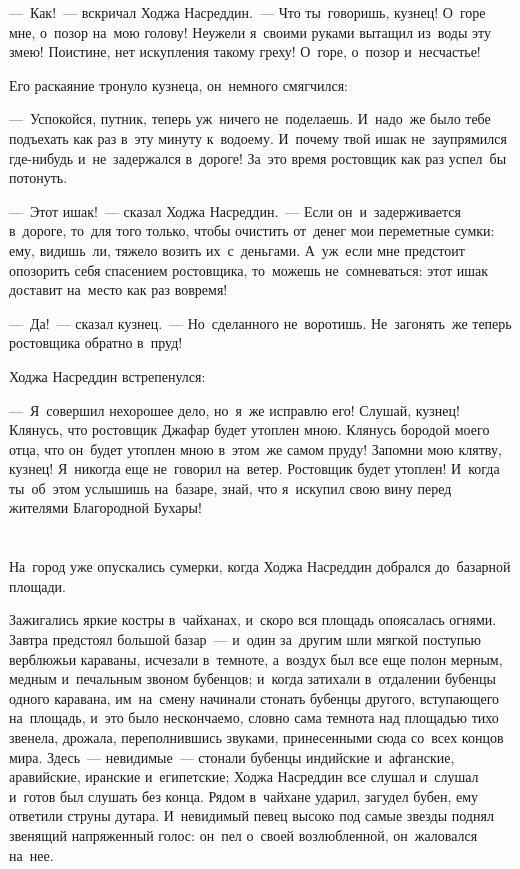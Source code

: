 \documentclass[12pt,a4paper]{book}
\begin{document}
—~Как!~— вскричал Ходжа Насреддин.~— Что ты~говоришь, кузнец! О~горе мне, о~позор на~мою голову! Неужели я~своими руками вытащил из~воды эту змею! Поистине, нет искупления такому греху! О~горе, о~позор и~несчастье!

Его раскаяние тронуло кузнеца, он~немного смягчился:

—~Успокойся, путник, теперь уж~ничего не~поделаешь. И~надо~же было тебе подъехать как раз в~эту минуту к~водоему. И~почему твой ишак не~заупрямился где-нибудь и~не~задержался в~дороге! За~это время ростовщик как раз успел~бы потонуть.

—~Этот ишак!~— сказал Ходжа Насреддин.~— Если он~и~задерживается в~дороге, то~для того только, чтобы очистить от~денег мои переметные сумки: ему, видишь~ли, тяжело возить их~с~деньгами. А~уж~если мне предстоит опозорить себя спасением ростовщика, то~можешь не~сомневаться: этот ишак доставит на~место как раз вовремя!

—~Да!~— сказал кузнец.~— Но~сделанного не~воротишь. Не~загонять~же теперь ростовщика обратно в~пруд!

Ходжа Насреддин встрепенулся:

—~Я~совершил нехорошее дело, но~я~же исправлю его! Слушай, кузнец! Клянусь, что ростовщик Джафар будет утоплен мною. Клянусь бородой моего отца, что он~будет утоплен мною в~этом~же самом пруду! Запомни мою клятву, кузнец! Я~никогда еще не~говорил на~ветер. Ростовщик будет утоплен! И~когда ты~об~этом услышишь на~базаре, знай, что я~искупил свою вину перед жителями Благородной Бухары!


\chapter{}

На~город уже опускались сумерки, когда Ходжа Насреддин добрался до~базарной площади.

Зажигались яркие костры в~чайханах, и~скоро вся площадь опоясалась огнями. Завтра предстоял большой базар~— и~один за~другим шли мягкой поступью верблюжьи караваны, исчезали в~темноте, а~воздух был все еще полон мерным, медным и~печальным звоном бубенцов; и~когда затихали в~отдалении бубенцы одного каравана, им~на~смену начинали стонать бубенцы другого, вступающего на~площадь, и~это было нескончаемо, словно сама темнота над площадью тихо звенела, дрожала, переполнившись звуками, принесенными сюда со~всех концов мира. Здесь~— невидимые~— стонали бубенцы индийские и~афганские, аравийские, иранские и~египетские; Ходжа Насреддин все слушал и~слушал и~готов был слушать без конца. Рядом в~чайхане ударил, загудел бубен, ему ответили струны дутара. И~невидимый певец высоко под самые звезды поднял звенящий напряженный голос: он~пел о~своей возлюбленной, он~жаловался на~нее.
\end{document}
